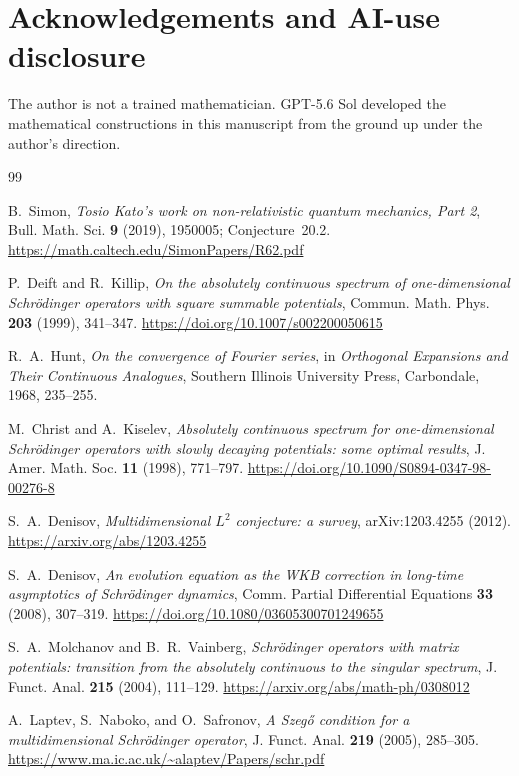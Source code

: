 \documentclass[11pt]{article}
\theoremstyle{definition}
\theoremstyle{remark}
\begin{document}
\section*{Acknowledgements and AI-use disclosure}

The author is not a trained mathematician.  GPT-5.6 Sol developed the
mathematical constructions in this manuscript from the ground up under the
author's direction.

\begin{thebibliography}{99}

B.~Simon,
\emph{Tosio Kato's work on non-relativistic quantum mechanics, Part 2},
Bull. Math. Sci. \textbf{9} (2019), 1950005; Conjecture~20.2.
\url{https://math.caltech.edu/SimonPapers/R62.pdf}

P.~Deift and R.~Killip,
\emph{On the absolutely continuous spectrum of one-dimensional Schr\"odinger operators with square summable potentials},
Commun. Math. Phys. \textbf{203} (1999), 341--347.
\url{https://doi.org/10.1007/s002200050615}

R.~A.~Hunt,
\emph{On the convergence of Fourier series},
in \emph{Orthogonal Expansions and Their Continuous Analogues},
Southern Illinois University Press, Carbondale, 1968, 235--255.

M.~Christ and A.~Kiselev,
\emph{Absolutely continuous spectrum for one-dimensional Schr\"odinger operators with slowly decaying potentials: some optimal results},
J. Amer. Math. Soc. \textbf{11} (1998), 771--797.
\url{https://doi.org/10.1090/S0894-0347-98-00276-8}

S.~A.~Denisov,
\emph{Multidimensional $L^2$ conjecture: a survey},
arXiv:1203.4255 (2012).
\url{https://arxiv.org/abs/1203.4255}

S.~A.~Denisov,
\emph{An evolution equation as the WKB correction in long-time asymptotics of Schr\"odinger dynamics},
Comm. Partial Differential Equations \textbf{33} (2008), 307--319.
\url{https://doi.org/10.1080/03605300701249655}

S.~A.~Molchanov and B.~R.~Vainberg,
\emph{Schr\"odinger operators with matrix potentials: transition from the absolutely continuous to the singular spectrum},
J. Funct. Anal. \textbf{215} (2004), 111--129.
\url{https://arxiv.org/abs/math-ph/0308012}

A.~Laptev, S.~Naboko, and O.~Safronov,
\emph{A Szeg\H{o} condition for a multidimensional Schr\"odinger operator},
J. Funct. Anal. \textbf{219} (2005), 285--305.
\url{https://www.ma.ic.ac.uk/~alaptev/Papers/schr.pdf}


\end{thebibliography}
\end{document}
